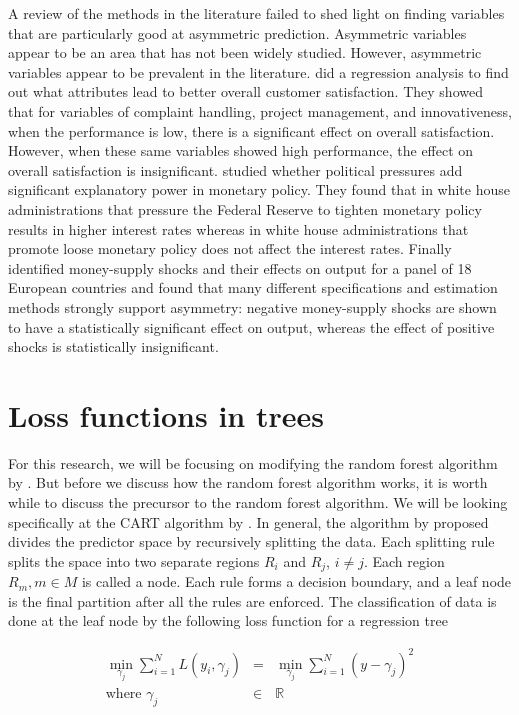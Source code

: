 A review of the methods in the literature failed to shed light on finding variables that are particularly good at asymmetric prediction. Asymmetric variables appear to be an area that has not been widely studied. However, asymmetric variables appear to be prevalent in the literature. \citet{Matzler04} did a regression analysis to find out what attributes lead to better overall customer satisfaction. They showed that for variables of complaint handling, project management, and innovativeness, when the performance is low, there is a significant effect on overall satisfaction. However, when these same variables showed high performance, the effect on overall satisfaction is insignificant. \citet{Froyen97} studied whether political pressures add significant explanatory power in monetary policy. They found that in white house administrations that pressure the Federal Reserve to tighten monetary policy results in higher interest rates whereas in white house administrations that promote loose monetary policy does not affect the interest rates. Finally \citet{Karras97} identified money-supply shocks and their effects on output for a panel of 18 European countries and found that many different specifications and estimation methods strongly support asymmetry: negative money-supply shocks are shown to have a statistically significant effect on output, whereas the effect of positive shocks is statistically insignificant. 

\section{Loss functions in trees}
For this research, we will be focusing on modifying the random forest algorithm by \citet{Breiman01}. But before we discuss how the random forest algorithm works, it is worth while to discuss the precursor to the random forest algorithm. We will be looking specifically at the CART algorithm by \citet{Breiman84}. In general, the algorithm by \citet{Breiman84} proposed divides the predictor space by recursively splitting the data. Each splitting rule splits the space into two separate regions $R_i$ and $R_j$, $i \neq j$. Each region $R_m,m \in M$ is called a node. Each rule forms a decision boundary, and a leaf node is the final partition after all the rules are enforced. The classification of data is done at the leaf node by the following loss function for a regression tree

\begin{equation}
	\begin{array}{rcl}
		\min_{\gamma_j} \sum_{i=1}^N L(y_i,\gamma_j) & = &  \min_{\gamma_j} \sum_{i=1}^N (y-\gamma_j)^2 \\
	\mbox{where }	\gamma_j &\in & \mathbb{R}	
	\end{array}
\end{equation}

